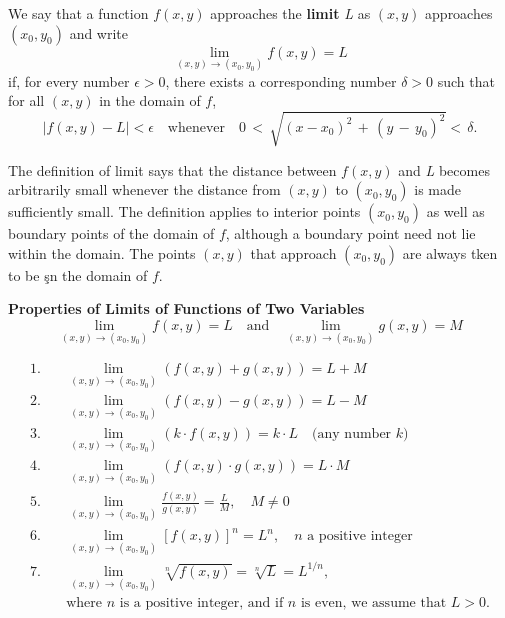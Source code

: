 \documentclass[12pt,a4paper,draft]{article}
\newenvironment{definition}{\begin{definitionbox}}{\end{definitionbox}\vspace{1\baselineskip}}
\newenvironment{theorem}{\begin{theorembox}}{\end{theorembox}\vspace{1\baselineskip}}
\begin{document}
\begin{definition}
    We say that a function \(f(x,y)\) approaches the \textbf{limit} \textit{L} as \((x,y)\) approaches \((x_0,y_0)\) and write
    \[\lim_{(x,y) \to (x_0,y_0) } f(x,y) = L\]
    if, for every number \(\epsilon > 0\), there exists a corresponding number \(\delta > 0\) such that for all \((x,y)\) in the domain of \(f\),
     \[\left|f(x,y) -\mathit{L} \right| < \epsilon \quad \text{whenever} \quad 0\,<\,\sqrt{(x-x_{0})^{2}\,+\,(y\,-\,y_{0})^{2}}<\,\delta.\]
\end{definition}

The definition of limit says that the distance between \(f(x,y)\) and \textit{L} becomes arbitrarily small whenever the distance from \((x,y)\) to \((x_0,y_0)\) is made sufficiently small.
The definition applies to interior points \((x_0,y_0)\) as well as boundary points of the domain of \(f\), although a boundary point need not lie within the domain. The points \((x,y)\) that approach \((x_0,y_0)\) are always tken to be şn the domain of \(f\).

\begin{theorem}
    \textbf{Properties of Limits of Functions of Two Variables}
    \[\operatorname*{lim}_{(x,y)\rightarrow(x_{0},y_{0})} f(x,y) = L \quad \text{and} \quad \operatorname*{lim}_{(x,y)\rightarrow(x_{0},y_{0})} g(x,y) = M\]

    \begin{align*}
        1. & \quad \lim_{(x, y) \rightarrow (x_0, y_0)} (f(x, y) + g(x, y)) = L + M \\
        2. & \quad \lim_{(x, y) \rightarrow (x_0, y_0)} (f(x, y) - g(x, y)) = L - M \\
        3. & \quad \lim_{(x, y) \rightarrow (x_0, y_0)} (k \cdot f(x, y)) = k \cdot L \quad \text{(any number $k$)} \\
        4. & \quad \lim_{(x, y) \rightarrow (x_0, y_0)} (f(x, y) \cdot g(x, y)) = L \cdot M \\
        5. & \quad \lim_{(x, y) \rightarrow (x_0, y_0)} \frac{f(x, y)}{g(x, y)} = \frac{L}{M}, \quad M \neq 0 \\
        6. & \quad \lim_{(x, y) \rightarrow (x_0, y_0)} [f(x, y)]^n = L^n, \quad n \text{ a positive integer} \\
        7. & \quad \lim_{(x, y) \rightarrow (x_0, y_0)} \sqrt[n]{f(x, y)} = \sqrt[n]{L} = L^{1/n}, \\
        & \quad \text{where $n$ is a positive integer, and if $n$ is even, we assume that $L > 0$.}
        \end{align*}
        
\end{theorem}
\end{document}
